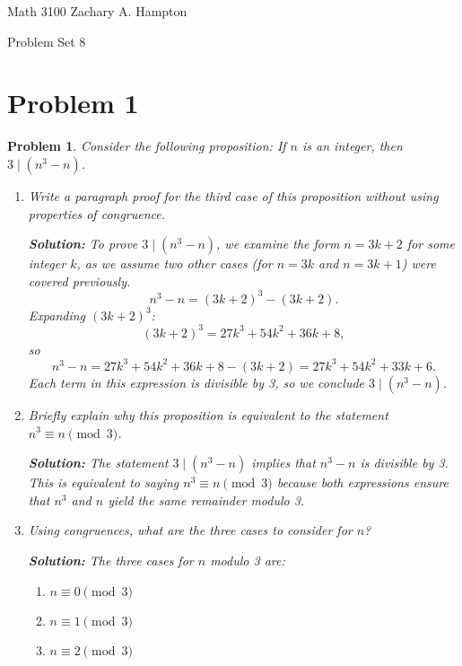 \documentclass[12pt]{article}
\newtheorem{problem}{Problem}
\theoremstyle{definition}
\begin{document}
Math 3100 \hfill Zachary A. Hampton

Problem Set 8 \hfill 
{}

\bigskip

\section*{Problem 1}

\begin{problem}
Consider the following proposition: If \( n \) is an integer, then \( 3 \mid (n^3 - n) \).

\begin{enumerate}[label=(\alph*)]
    \item Write a paragraph proof for the third case of this proposition without using properties of congruence.
    
    \textbf{Solution:} To prove \( 3 \mid (n^3 - n) \), we examine the form \( n = 3k + 2 \) for some integer \( k \), as we assume two other cases (for \( n = 3k \) and \( n = 3k + 1 \)) were covered previously.
    \[
    n^3 - n = (3k + 2)^3 - (3k + 2).
    \]
    Expanding \( (3k + 2)^3 \): 
    \[
    (3k + 2)^3 = 27k^3 + 54k^2 + 36k + 8,
    \]
    so
    \[
    n^3 - n = 27k^3 + 54k^2 + 36k + 8 - (3k + 2) = 27k^3 + 54k^2 + 33k + 6.
    \]
    Each term in this expression is divisible by 3, so we conclude \( 3 \mid (n^3 - n) \).

    \item Briefly explain why this proposition is equivalent to the statement \( n^3 \equiv n \pmod{3} \).
    
    \textbf{Solution:} The statement \( 3 \mid (n^3 - n) \) implies that \( n^3 - n \) is divisible by 3. This is equivalent to saying \( n^3 \equiv n \pmod{3} \) because both expressions ensure that \( n^3 \) and \( n \) yield the same remainder modulo 3.

    \item Using congruences, what are the three cases to consider for \( n \)?

    \textbf{Solution:} The three cases for \( n \) modulo 3 are:
    \begin{enumerate}
        \item \( n \equiv 0 \pmod{3} \)
        \item \( n \equiv 1 \pmod{3} \)
        \item \( n \equiv 2 \pmod{3} \)
    \end{enumerate}
    

\end{enumerate}
\end{problem}
\end{document}

